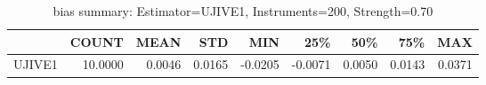 \begin{table}[ht]
\centering
\caption{bias summary: Estimator=UJIVE1, Instruments=200, Strength=0.70}
\begin{tabular}{lrrrrrrrr}
\toprule
 & COUNT & MEAN & STD & MIN & 25\% & 50\% & 75\% & MAX \\
\midrule
UJIVE1 & 10.0000 & 0.0046 & 0.0165 & -0.0205 & -0.0071 & 0.0050 & 0.0143 & 0.0371 \\
\bottomrule
\end{tabular}
\end{table}
